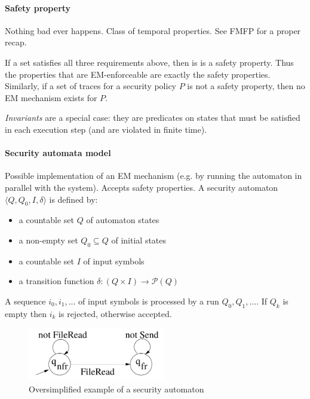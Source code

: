 \paragraph{Safety property} Nothing bad ever happens. Class of temporal properties. See FMFP for a proper recap. 

If a set satisfies all three requirements above, then is is a safety property. Thus the properties that are EM-enforceable are exactly the safety properties.
Similarly, if a set of traces for a security policy $P$ is not a safety property, then no EM mechanism exists for $P$.

\emph{Invariants} are a special case: they are predicates on states that must be satisfied in each execution step (and are violated in finite time).


\paragraph{Security automata model} Possible implementation of an EM mechanism (e.g. by running the automaton in parallel with the system). Accepts safety properties. A security automaton $\langle Q, Q_0, I, \delta \rangle$ is defined by:
\begin{itemize}
    \item a countable set $Q$ of automaton states
    \item a non-empty set $Q_0 \subseteq Q$ of initial states
    \item a countable set $I$ of input symbols
    \item a transition function $\delta : (Q \times I) \rightarrow \mathcal{P}(Q)$
\end{itemize}
A sequence $i_0, i_1, ...$ of input symbols is processed by a run $Q_0, Q_1, ...$. If $Q_{k}$ is empty then $i_k$ is rejected, otherwise accepted.

\begin{figure}[h]
    \centering
    \includegraphics[width=6cm]{images/ch11-ac-automaton.png}
    \caption{Oversimplified example of a security automaton}
    \label{fig:ac-automaton}
\end{figure}



\newpage
